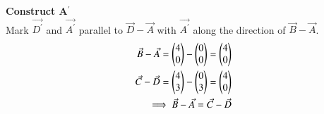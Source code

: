 \documentclass[journal]{IEEEtran}
\begin{document}
\textbf{Construct A$^{\prime}$}\\
Mark $\vec{D^{\prime}}$ and $\vec{A^{\prime}}$ parallel to $\vec{D}-\vec{A}$ with $\vec{A^{\prime}}$ along the direction of  $\vec{B}-\vec{A}$.\\
\begin{align}
    \Vec{B}-\Vec{A}=\begin{pmatrix}4\\0\end{pmatrix}-\begin{pmatrix}0\\0\end{pmatrix}=\begin{pmatrix}4\\0\end{pmatrix}\\
    \Vec{C}-\Vec{D}=\begin{pmatrix}4\\3\end{pmatrix}-\begin{pmatrix}0\\3\end{pmatrix}=\begin{pmatrix}4\\0\end{pmatrix}\\
\implies \Vec{B}-\Vec{A}=\Vec{C}-\Vec{D}
\end{align}
\end{document}
